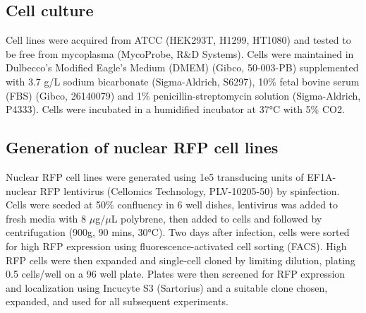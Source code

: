 \subsection{Cell culture}
Cell lines were acquired from ATCC (HEK293T, H1299, HT1080) and tested to be free from mycoplasma (MycoProbe, R\&D Systems).
Cells were maintained in Dulbecco’s Modified Eagle’s Medium (DMEM) (Gibco, 50-003-PB) supplemented with 3.7 g/L sodium bicarbonate (Sigma-Aldrich, S6297), 10\% fetal bovine serum (FBS) (Gibco, 26140079) and 1\% penicillin-streptomycin solution (Sigma-Aldrich, P4333).
Cells were incubated in a humidified incubator at 37°C with 5\% CO2.

\subsection{Generation of nuclear RFP cell lines}
Nuclear RFP cell lines were generated using 1e5 transducing units of EF1A-nuclear RFP lentivirus (Cellomics Technology, PLV-10205-50) by spinfection.
Cells were seeded at 50\% confluency in 6 well dishes, lentivirus was added to fresh media with 8 $\mu$g/$\mu$L polybrene, then added to cells and followed by centrifugation (900g, 90 mins, 30°C).
Two days after infection, cells were sorted for high RFP expression using fluorescence-activated cell sorting (FACS).
High RFP cells were then expanded and single-cell cloned by limiting dilution, plating 0.5 cells/well on a 96 well plate.
Plates were then screened for RFP expression and localization using Incucyte S3 (Sartorius) and a suitable clone chosen, expanded, and used for all subsequent experiments.

